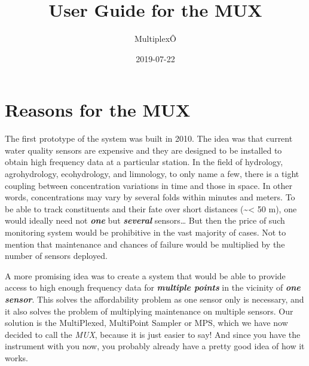 \documentclass[]{book}
\title{User Guide for the MUX}
\author{MultiplexÔ}
\date{2019-07-22}
\begin{document}
\maketitle

{
\setcounter{tocdepth}{1}
\tableofcontents
}
\hypertarget{reasons-for-the-mux}{%
\chapter{Reasons for the MUX}\label{reasons-for-the-mux}}

The first prototype of the system was built in 2010. The idea was that current water quality sensors are expensive and they are designed to be installed to obtain high frequency data at a particular station. In the field of hydrology, agrohydrology, ecohydrology, and limnology, to only name a few, there is a tight coupling between concentration variations in time and those in space. In other words, concentrations may vary by several folds within minutes and meters. To be able to track constituents and their fate over short distances (\textasciitilde{}\textless{} 50 m), one would ideally need not \emph{\textbf{one}} but \emph{\textbf{several}} sensors\ldots{} But then the price of such monitoring system would be prohibitive in the vast majority of cases. Not to mention that maintenance and chances of failure would be multiplied by the number of sensors deployed.

A more promising idea was to create a system that would be able to provide access to high enough frequency data for \emph{\textbf{multiple points}} in the vicinity of \emph{\textbf{one sensor}}. This solves the affordability problem as one sensor only is necessary, and it also solves the problem of multiplying maintenance on multiple sensors. Our solution is the MultiPlexed, MultiPoint Sampler or MPS, which we have now decided to call the \emph{MUX}, because it is just easier to say! And since you have the instrument with you now, you probably already have a pretty good idea of how it works.
\end{document}
